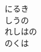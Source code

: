 \documentclass[10pt,b5j]{tarticle} %
\begin{document}
\begin{enumerate}
\begin{minipage}[c]{\blocksize}
        \vspace{\linespace}
        \item
        にるき\\
        しうの\\
        れしはの\\
        のくは
    
    \end{minipage}
\end{enumerate} %
\end{document}
